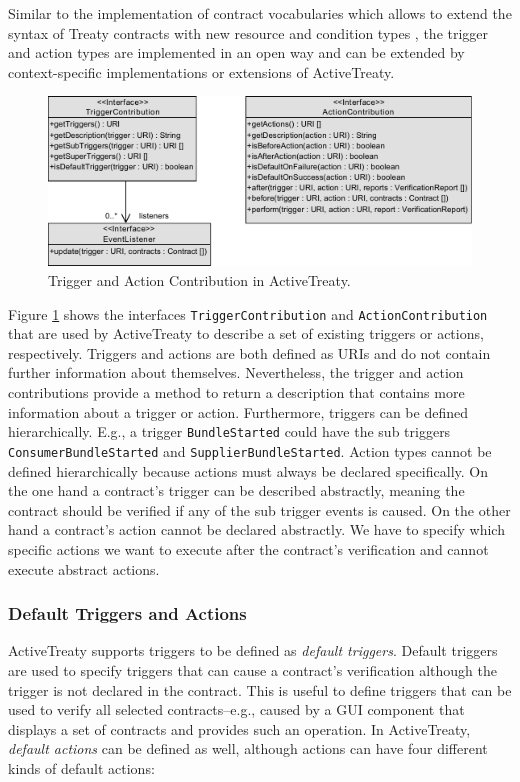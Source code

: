 \documentclass{llncs}
\begin{document}
Similar to the implementation of contract vocabularies which allows to extend the syntax of Treaty contracts with new resource and condition types \cite{Treaty.JOT2009}, the trigger and action types are implemented in an open way and can be extended by context-specific implementations or extensions of ActiveTreaty.

\begin{figure}[htbp]
\centering
\includegraphics[width=1.0\textwidth]{ContributorModel1.pdf}
\caption{Trigger and Action Contribution in ActiveTreaty.}
\label{fig:contribution}
\end{figure}

Figure \ref{fig:contribution} shows the interfaces \texttt{TriggerContribution} and \texttt{Action\-Con\-tri\-bu\-tion} that are used by ActiveTreaty to describe a set of existing triggers or actions, respectively. Triggers and actions are both defined as URIs and do not contain further information about themselves. Nevertheless, the trigger and action contributions provide a method to return a description that contains more information about a trigger or action. Furthermore, triggers can be defined hierarchically. E.g., a trigger \texttt{BundleStarted} could have the sub triggers \texttt{ConsumerBundleStarted} and \texttt{SupplierBundleStarted}. Action types cannot be defined hierarchically because actions must always be declared specifically. On the one hand a contract's trigger can be described abstractly, meaning the contract should be verified if any of the sub trigger events is caused. On the other hand a contract's action cannot be declared abstractly. We have to specify which specific actions we want to execute after the contract's verification and cannot execute abstract actions.


\subsubsection{Default Triggers and Actions}

ActiveTreaty supports triggers to be defined as \textit{default triggers}. Default triggers are used to specify triggers that can cause a contract's verification although the trigger is not declared in the contract. This is useful to define triggers that can be used to verify all selected contracts--e.g., caused by a GUI component that displays a set of contracts and provides such an operation. In ActiveTreaty, \textit{default actions} can be defined as well, although actions can have four different kinds of default actions:
\end{document}
